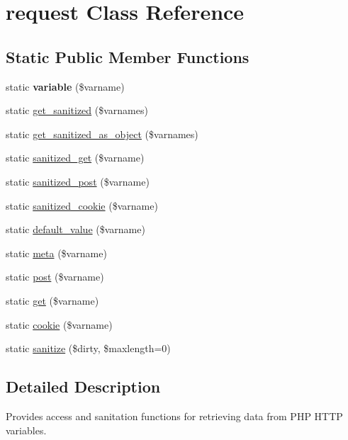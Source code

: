 \hypertarget{classrequest}{\section{request Class Reference}
\label{classrequest}
}
\subsection*{Static Public Member Functions}
\begin{DoxyCompactItemize}
\item 
\hypertarget{classrequest_a42e169359ae51a3b5d68cc045e04f53c}{static {\bfseries variable} (\$varname)}\label{classrequest_a42e169359ae51a3b5d68cc045e04f53c}

\item 
static \hyperlink{classrequest_af5a8fd0735268d19657c87848b5827c4}{get\-\_\-sanitized} (\$varnames)
\item 
static \hyperlink{classrequest_abc216f18819cc535803c10177e6b89a6}{get\-\_\-sanitized\-\_\-as\-\_\-object} (\$varnames)
\item 
static \hyperlink{classrequest_a34d4adad12486829a5c14719a298797c}{sanitized\-\_\-get} (\$varname)
\item 
static \hyperlink{classrequest_a21f215aed587e3bfa86b3d2cf1f666f6}{sanitized\-\_\-post} (\$varname)
\item 
static \hyperlink{classrequest_a053c8d3b0c70d2d0f6db4810d9f0b3ba}{sanitized\-\_\-cookie} (\$varname)
\item 
static \hyperlink{classrequest_a37ee0eb6206a252716bc33cd4c0e7916}{default\-\_\-value} (\$varname)
\item 
static \hyperlink{classrequest_abac59171326160dc151ded6601f8da37}{meta} (\$varname)
\item 
static \hyperlink{classrequest_a544f6a832bdef9bd3857082da95887b6}{post} (\$varname)
\item 
static \hyperlink{classrequest_a322e929c6e065ccf688769109400b43b}{get} (\$varname)
\item 
static \hyperlink{classrequest_acb2ddb22763f6a73e2e5c4990edc277e}{cookie} (\$varname)
\item 
static \hyperlink{classrequest_aadbff81f737c00e5a9d634df19bc47cc}{sanitize} (\$dirty, \$maxlength=0)
\end{DoxyCompactItemize}


\subsection{Detailed Description}
Provides access and sanitation functions for retrieving data from P\-H\-P H\-T\-T\-P variables.

